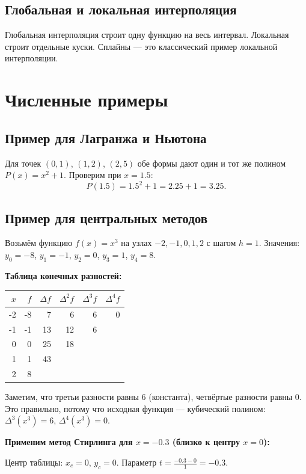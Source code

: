 \documentclass[12pt,a4paper]{article}
\begin{document}
\subsection{Глобальная и локальная интерполяция}
Глобальная интерполяция строит одну функцию на весь интервал. Локальная строит отдельные куски. Сплайны --- это классический пример локальной интерполяции.

\section{Численные примеры}

\subsection{Пример для Лагранжа и Ньютона}

Для точек $(0,1)$, $(1,2)$, $(2,5)$ обе формы дают один и тот же полином $P(x)=x^2+1$. Проверим при $x=1.5$:
\[
P(1.5)=1.5^2+1=2.25+1=3.25.
\]

\subsection{Пример для центральных методов}

Возьмём функцию $f(x)=x^3$ на узлах $-2,-1,0,1,2$ с шагом $h=1$. Значения: $y_0=-8$, $y_1=-1$, $y_2=0$, $y_3=1$, $y_4=8$.

\textbf{Таблица конечных разностей:}
\begin{center}
\begin{tabular}{r r r r r r}
\toprule
$x$ & $f$ & $\Delta f$ & $\Delta^2 f$ & $\Delta^3 f$ & $\Delta^4 f$ \\
\midrule
-2 & -8 & 7 & 6 & 6 & 0 \\
-1 & -1 & 13 & 12 & 6 &  \\
0 & 0 & 25 & 18 &  &  \\
1 & 1 & 43 &  &  &  \\
2 & 8 &  &  &  &  \\
\bottomrule
\end{tabular}
\end{center}

Заметим, что третьи разности равны $6$ (константа), четвёртые разности равны $0$. Это правильно, потому что исходная функция --- кубический полином: $\Delta^3(x^3) = 6$, $\Delta^4(x^3) = 0$.

\textbf{Применим метод Стирлинга для $x = -0.3$ (близко к центру $x=0$):}

Центр таблицы: $x_c = 0$, $y_c = 0$. Параметр $t = \frac{-0.3 - 0}{1} = -0.3$.
\end{document}
